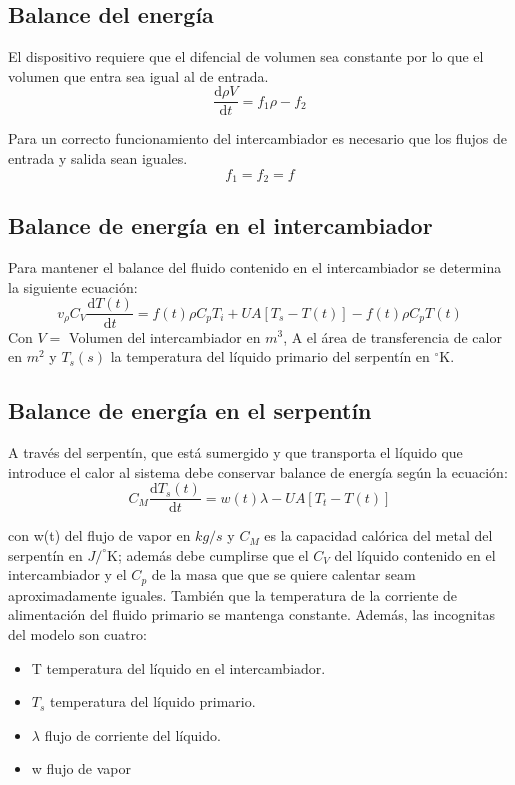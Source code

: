 \documentclass[12pt,letterpaper]{article}     %
\begin{document}
\subsection{Balance del energía}
El dispositivo requiere que el difencial de volumen sea constante por lo que el volumen que entra sea igual al de entrada.
\begin{equation}
\frac{\mathrm{d}\rho V }{\mathrm{d} t} = f_1\rho  - f_2 
\label{eq:volumen}
\end{equation}

Para un correcto funcionamiento del intercambiador es necesario que los flujos de entrada y salida sean iguales.
\begin{equation}
    f_1 = f_2 = f
    \label{eq:Flujos}
\end{equation}

\subsection{Balance de energía en el intercambiador}
Para mantener el balance del fluido contenido en el intercambiador se determina la siguiente ecuación: \\
 \begin{equation}
v_{\rho }C_{V}\frac{\mathrm{d} T(t)}{\mathrm{d} t}= f(t)\rho C_{p}T_{i}+UA[T_{s}-T(t)]-f(t)\rho C_{p}T(t)
\label{eq:BalanFlui}
 \end{equation}
Con $V=$ Volumen del intercambiador en $m^3$, A el área de transferencia de calor en $m^2$ y $T_s(s)$ la temperatura del líquido primario del serpentín en $^{\circ}$K.

\subsection{Balance de energía en el serpentín}
A través del serpentín, que está sumergido y que transporta el líquido que introduce el calor al sistema debe conservar balance de energía según la ecuación: \\
\begin{equation}
C_{M}\frac{\mathrm{d} T_{s}(t)}{\mathrm{d} t} = w(t)\lambda - UA[T_{t}- T(t)]
\label{eq:EnergSerp}
\end{equation}

con w(t) del flujo de vapor en $kg/s$ y $C_M$ es la capacidad calórica del metal del serpentín en $J/^{\circ}$K; además debe cumplirse que el $C_V$ del líquido contenido en el intercambiador y el $C_p$ de la masa que que se quiere calentar seam aproximadamente iguales. También que la temperatura de la corriente de alimentación del fluido primario se mantenga constante.
Además, las incognitas del modelo son cuatro:
\newpage
\begin{itemize}
    \item T    temperatura del líquido en el intercambiador.
    \item $T_s$   temperatura del líquido primario.
    \item $\lambda$   flujo de corriente del líquido.
    \item w    flujo de vapor
\end{itemize} 
\end{document}
